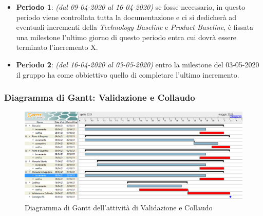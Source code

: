 \begin{itemize}
\item \textbf{Periodo 1}: \textit{(dal 09-04-2020 al 16-04-2020)} se fosse necessario, in questo periodo viene controllata tutta la documentazione e ci si dedicherà ad eventuali incrementi della \textit{Technology Baseline} e \textit{Product Baseline}, è fissata una milestone l'ultimo giorno di questo periodo entra cui dovrà essere terminato l'incremento X.

\item \textbf{Periodo 2}: \textit{(dal 16-04-2020 al 03-05-2020)} entro la milestone del 03-05-2020 il gruppo ha come obbiettivo quello di completare l'ultimo incremento.

\end{itemize}
\newpage
\subsubsection{Diagramma di Gantt: Validazione e Collaudo}
\begin{figure}[h]
	\centering
	\includegraphics[scale=0.5]{Images/GanttValidazioneCollaudo.PNG}
	\caption{Diagramma di Gantt dell'attività di Validazione e Collaudo}
\end{figure}